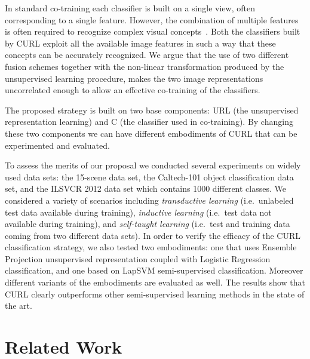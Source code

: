 \documentclass[journal,11pt]{IEEEtran}
\newcommand{\ADD}[1]{#1}
\newcommand{\coso}{strategy}
\newcommand{\emb}{embodiment}
\begin{document}
In standard co-training each classifier is built on a single view,
often corresponding to a single feature.  However, the combination of
multiple features is often required to recognize complex visual
concepts~\cite{Iyengar03,Gehler09,natarajan12}. Both the classifiers built by CURL exploit all
the available image features in such a way that these concepts can be
accurately recognized.  \ADD{We argue that} the use of two different fusion schemes
together with the non-linear transformation produced by the
unsupervised learning procedure, makes the two image representations
uncorrelated enough to allow an effective co-training of the
classifiers.

\ADD{The proposed \coso{ }is built on two base components: URL (the unsupervised representation learning) and C (the classifier used in co-training). 
By changing these two components we can have different \emb{s} of CURL that can be experimented and evaluated.}%

To assess the merits of our proposal we conducted several experiments
on widely used data sets: the 15-scene data set\ADD{, the
Caltech-101 object classification data set, and the ILSVCR 2012 data set which contains 1000 different classes}.  We considered a variety
of scenarios including \emph{transductive learning} (i.e.~unlabeled test data
available during training), \emph{inductive learning} (i.e.~test data not
available during training), and \emph{self-taught learning} (i.e.~test and
training data coming from two different data sets).  \ADD{In order to verify the efficacy of the CURL classification \coso, we also tested two \emb{s}: one that uses Ensemble Projection unsupervised representation coupled with Logistic Regression classification, and one based on LapSVM semi-supervised classification.
Moreover different variants of the \emb{s} are evaluated as well.} The results
show that CURL clearly outperforms other semi-supervised learning
methods in the state of the art.


\section{Related Work}
\label{sec:related}
\end{document}
